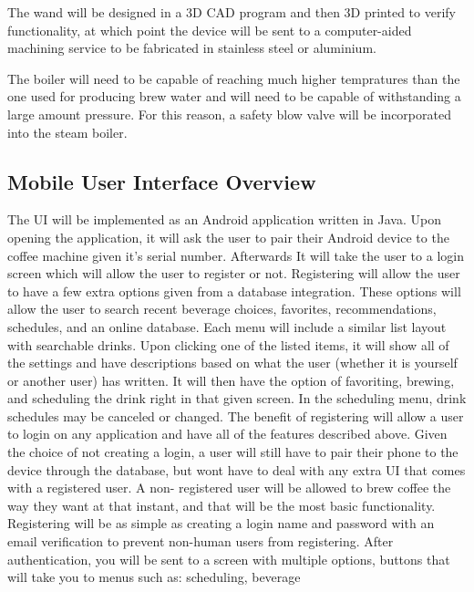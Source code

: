 \documentclass[conference]{IEEEtran}
\begin{document}
The wand will be designed in a 3D CAD program and then 3D printed to verify
functionality, at which point the device will be sent to a computer-aided
machining service to be fabricated in stainless steel or aluminium.

The boiler will need to be capable of reaching much higher tempratures than the
one used for producing brew water and will need to be capable of withstanding a
large amount pressure. For this reason, a safety blow valve will be incorporated
into the steam boiler.

\subsection{Mobile User Interface Overview}
The UI will be implemented as an Android application written in Java. Upon
opening the application, it will ask the user to pair their Android device to the coffee machine given it's serial number. Afterwards It will 
take the user to a login screen which will allow the user to register or not. Registering will allow the user 
to have a
few extra options given from a database integration. These options will allow the user to search recent
beverage choices, favorites, recommendations, schedules, and an online database. Each menu will 
include a similar list layout with searchable drinks. Upon clicking one of the listed items, it will show all 
of the settings and have descriptions based on what the user (whether it is yourself or another user) has 
written. It will then have the option of favoriting, brewing, and scheduling the drink right in that given 
screen. In the scheduling menu, drink schedules may be canceled or changed. The benefit of 
registering will allow a user to login on any application and have all of the features described above. 
Given the choice of not creating a login, a user will still have to pair their phone to the device through 
the database, but wont have to deal with any extra UI that comes with a registered user. A non-
registered user will be allowed to brew coffee the way they want at that instant, and that will be 
the most basic functionality. Registering will be as simple as creating a login
name and password with an email verification to prevent non-human users from
registering. After authentication, you will be sent to a screen with multiple options, buttons that will take you to menus such as: scheduling, beverage 
\end{document}
